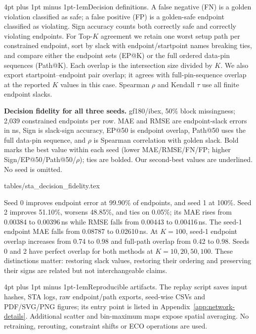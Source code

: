 \documentclass{article}
\makeatletter
\renewcommand{\paragraph}{\@startsection{paragraph}{4}{\z@}
  {4pt plus 1pt minus 1pt}{-1em}{\normalsize\bf}}
\newcommand{\tabdir}{tables}
\newcommand{\tableinput}[1]{\@@input \tabdir/#1 }
\makeatother
\begin{document}
\paragraph{Decision definitions.}
A false negative (FN) is a golden violation classified as safe; a false positive
(FP) is a golden-safe endpoint classified as violating. Sign accuracy counts
both correctly safe and correctly violating endpoints. For Top-$K$ agreement
we retain one worst setup path per constrained endpoint, sort by slack with
endpoint/startpoint names breaking ties, and compare either the endpoint sets
(EP@K) or the full ordered data-pin sequences (Path@K). Each overlap is the
intersection size divided by $K$. We also export startpoint--endpoint pair
overlap; it agrees with full-pin-sequence overlap at the reported $K$ values
in this case. Spearman $\rho$ and Kendall $\tau$ use all finite endpoint slacks.

\begin{table}[htbp]
\centering\small
\caption{\textbf{Decision fidelity for all three seeds.} gf180/ibex,
50\% block missingness; 2,039 constrained endpoints per row. MAE and RMSE are
endpoint-slack errors in ns, Sign is slack-sign accuracy, EP@50 is endpoint
overlap, Path@50 uses the full data-pin sequence, and $\rho$ is Spearman
correlation with golden slack. Bold marks the best value within each seed
(lower MAE/RMSE/FN/FP; higher Sign/EP@50/Path@50/$\rho$); ties are bolded.
Our second-best values are underlined. No seed is omitted.}
\label{tab:sta-decision}
\tableinput{sta_decision_fidelity.tex}
\end{table}

Seed 0 improves endpoint error at 99.90\% of endpoints, and seed 1 at
100\%. Seed 2 improves 51.10\%, worsens 48.85\%, and ties on 0.05\%;
its MAE rises from 0.00384 to 0.00396\,ns while RMSE falls from
0.00443 to 0.00416\,ns. The seed-1 endpoint MAE falls from 0.08787 to
0.02610\,ns. At $K=100$, seed-1 endpoint overlap increases from 0.74 to
0.98 and full-path overlap from 0.42 to 0.98. Seeds 0 and 2 have perfect
overlap for both methods at $K=10,20,50,100$. These distinctions matter:
restoring slack values, restoring their ordering and preserving their signs
are related but not interchangeable claims.

\paragraph{Reproducible artifacts.}
The replay script saves input hashes, STA logs, raw endpoint/path exports,
seed-wise CSVs and PDF/SVG/PNG figures; its entry point is listed in
Appendix~\ref{app:network-details}. Additional
scatter and bin-maximum maps expose spatial averaging. No retraining,
rerouting, constraint shifts or ECO operations are used.
\end{document}
